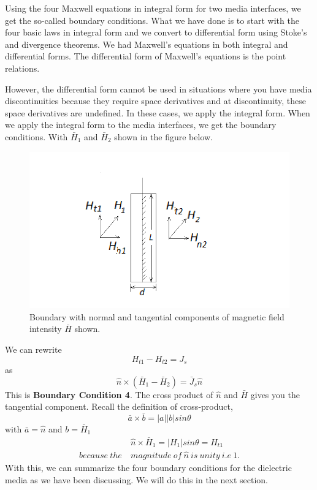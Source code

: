 Using the four Maxwell equations in integral form for two media interfaces, we get the so-called boundary conditions. What we have done is to start with the four basic laws in integral form and we convert to differential form using Stoke's and divergence theorems. We had Maxwell's equations in both integral and differential forms. The differential form of Maxwell's equations is the point relations.

However, the differential form cannot be used in situations where you have media discontinuities because they require space derivatives and at discontinuity, these space derivatives are undefined. In these cases, we apply the integral form. When we apply the integral form to the media interfaces, we get the boundary conditions. With $\bar{H}_1$ and $\bar{H}_2$ shown in the figure below.
\begin{figure}[h]
\centering
\includegraphics[width=1\linewidth]{./graphics/diemedium4_2_2}
\caption{Boundary with normal and tangential components of magnetic field intensity $\bar{H}$ shown.}
\end{figure}

We can rewrite 
\begin{equation*}
H_{t1} - H_{t2} = J_s
\end{equation*}
as
\begin{equation}
\hat{n} \times (\bar{H}_1 - \bar{H}_2) = \bar{J}_s\hat{n}
\end{equation}
This is \textbf{Boundary Condition 4}. The cross product of $\hat{n}$ and $\bar{H}$ gives you the tangential component. Recall the definition of cross-product,
\begin{equation*}
\bar{a}\times\bar{b} = \left|a \right| \left|b \right|sin\theta 
\end{equation*}
with $\bar{a} = \hat{n}$ and $ b = \bar{H}_1$
\begin{align*}
&\hat{n}\times\bar{H}_1 = \left|H_1 \right|sin\theta = H_{t1} \\ because\ the\ & magnitude\ of\ \hat{n}\ is\ unity\ i.e\ 1.
\end{align*}
With this, we can summarize the four boundary conditions for the dielectric media as we have been discussing. We will do this in the next section.

